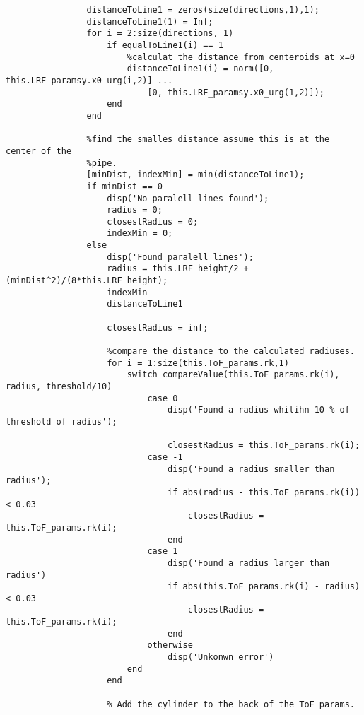 \begin{lstlisting}
                distanceToLine1 = zeros(size(directions,1),1);
                distanceToLine1(1) = Inf;
                for i = 2:size(directions, 1)
                    if equalToLine1(i) == 1
                        %calculat the distance from centeroids at x=0
                        distanceToLine1(i) = norm([0, this.LRF_paramsy.x0_urg(i,2)]-...
                            [0, this.LRF_paramsy.x0_urg(1,2)]);
                    end
                end
                
                %find the smalles distance assume this is at the center of the
                %pipe.
                [minDist, indexMin] = min(distanceToLine1);
                if minDist == 0
                    disp('No paralell lines found');
                    radius = 0;
                    closestRadius = 0;
                    indexMin = 0;
                else
                    disp('Found paralell lines');
                    radius = this.LRF_height/2 + (minDist^2)/(8*this.LRF_height);
                    indexMin
                    distanceToLine1
                    
                    closestRadius = inf;
                    
                    %compare the distance to the calculated radiuses.
                    for i = 1:size(this.ToF_params.rk,1)
                        switch compareValue(this.ToF_params.rk(i), radius, threshold/10)
                            case 0
                                disp('Found a radius whitihn 10 % of threshold of radius');
                                
                                closestRadius = this.ToF_params.rk(i);
                            case -1
                                disp('Found a radius smaller than radius');
                                if abs(radius - this.ToF_params.rk(i)) < 0.03
                                    closestRadius = this.ToF_params.rk(i);
                                end
                            case 1
                                disp('Found a radius larger than radius')
                                if abs(this.ToF_params.rk(i) - radius) < 0.03
                                    closestRadius = this.ToF_params.rk(i);
                                end
                            otherwise
                                disp('Unkonwn error')
                        end
                    end
                    
                    % Add the cylinder to the back of the ToF_params.
                    

\end{lstlisting}
